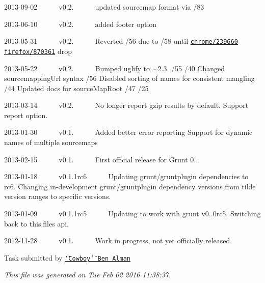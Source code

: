 \begin{DoxyItemize}
\item 2013-\/09-\/02   v0.2.   updated sourcemap format via /83
\item 2013-\/06-\/10   v0.2.   added footer option
\item 2013-\/05-\/31   v0.2.   \+Reverted /56 due to /58 until \href{https://code.google.com/p/chromium/issues/detail?id=239660&q=sourcemappingurl&colspec=ID%20Pri%20M%20Iteration%20ReleaseBlock%20Cr%20Status%20Owner%20Summary%20OS%20Modified}{\tt chrome/239660} \href{https://bugzilla.mozilla.org/show_bug.cgi?id=870361}{\tt firefox/870361} drop
\item 2013-\/05-\/22   v0.2.   \+Bumped uglify to $\sim$2.3. /55 /40 Changed sourcemapping\+Url syntax /56 Disabled sorting of names for consistent mangling /44 Updated docs for source\+Map\+Root /47 /25
\item 2013-\/03-\/14   v0.2.   \+No longer report gzip results by default. Support {\ttfamily report} option.
\item 2013-\/01-\/30   v0.1.   \+Added better error reporting Support for dynamic names of multiple sourcemaps
\item 2013-\/02-\/15   v0.1.   \+First official release for Grunt 0...
\item 2013-\/01-\/18   v0.1.\+1rc6   \+Updating grunt/gruntplugin dependencies to rc6. Changing in-\/development grunt/gruntplugin dependency versions from tilde version ranges to specific versions.
\item 2013-\/01-\/09   v0.1.\+1rc5   \+Updating to work with grunt v0..\+0rc5. Switching back to this.\+files api.
\item 2012-\/11-\/28   v0.1.   \+Work in progress, not yet officially released. 


\end{DoxyItemize}

Task submitted by \href{http://benalman.com}{\tt \char`\"{}\+Cowboy\char`\"{} Ben Alman}

{\itshape This file was generated on Tue Feb 02 2016 11\+:38\+:37.} 